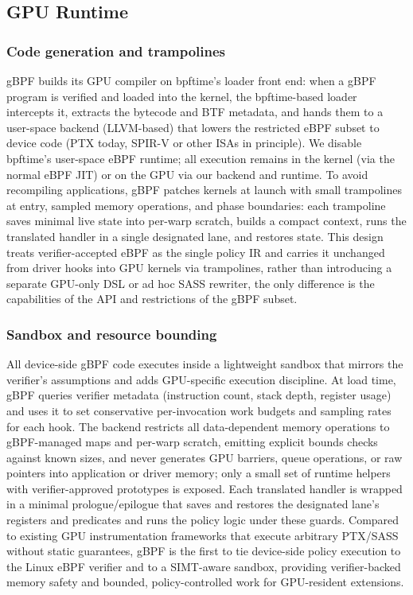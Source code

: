\subsection{GPU Runtime}
\label{sec:impl-gpu}

\subsubsection{Code generation and trampolines}
gBPF builds its GPU compiler on bpftime’s loader front end: when a gBPF program is verified and loaded into the kernel, the bpftime-based loader intercepts it, extracts the bytecode and BTF metadata, and hands them to a user-space backend (LLVM-based) that lowers the restricted eBPF subset to device code (PTX today, SPIR-V or other ISAs in principle). We disable bpftime’s user-space eBPF runtime; all execution remains in the kernel (via the normal eBPF JIT) or on the GPU via our backend and runtime. To avoid recompiling applications, gBPF patches kernels at launch with small trampolines at entry, sampled memory operations, and phase boundaries: each trampoline saves minimal live state into per-warp scratch, builds a compact context, runs the translated handler in a single designated lane, and restores state. This design treats verifier-accepted eBPF as the single policy IR and carries it unchanged from driver hooks into GPU kernels via trampolines, rather than introducing a separate GPU-only DSL or ad hoc SASS rewriter, the only difference is the capabilities of the API and restrictions of the gBPF subset.



\subsubsection{Sandbox and resource bounding}
All device-side gBPF code executes inside a lightweight sandbox that mirrors the verifier’s assumptions and adds GPU-specific execution discipline. At load time, gBPF queries verifier metadata (instruction count, stack depth, register usage) and uses it to set conservative per-invocation work budgets and sampling rates for each hook. The backend restricts all data-dependent memory operations to gBPF-managed maps and per-warp scratch, emitting explicit bounds checks against known sizes, and never generates GPU barriers, queue operations, or raw pointers into application or driver memory; only a small set of runtime helpers with verifier-approved prototypes is exposed. Each translated handler is wrapped in a minimal prologue/epilogue that saves and restores the designated lane’s registers and predicates and runs the policy logic under these guards. Compared to existing GPU instrumentation frameworks that execute arbitrary PTX/SASS without static guarantees, gBPF is the first to tie device-side policy execution to the Linux eBPF verifier and to a SIMT-aware sandbox, providing verifier-backed memory safety and bounded, policy-controlled work for GPU-resident extensions.


